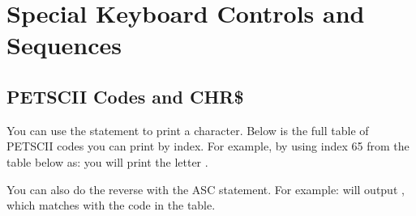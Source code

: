 \chapter{Special Keyboard Controls and Sequences}


\section{PETSCII Codes and CHR\$}

\label{appendix:asciicodes}

You can use the  statement to print a character.
Below is the full table of PETSCII codes you can print by index.  For example, by
using index 65 from the table below as:  you will
print the letter .

You can also do the reverse with the ASC statement.  For example:
 will output , which matches with the
code in the table.

